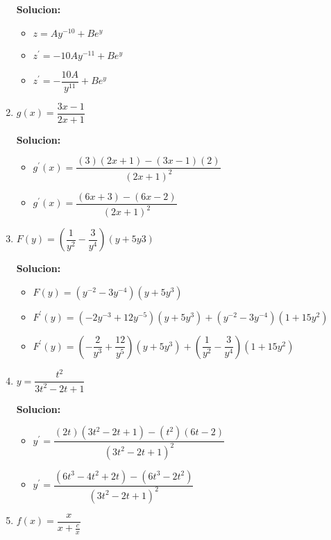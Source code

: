 \documentclass{article}
\begin{document}
\begin{enumerate}[start=5, label=\textbf{\arabic*.}]
    \textbf{Solucion: }
    \begin{itemize}
        \item $z = Ay^{-10} + Be^y$
        \item $z^{\prime} = -10Ay^{-11} + Be^y$
        \item $z^{\prime} = -\dfrac{10A}{y^{11}} + Be^y$
    \end{itemize}
    \vspace{0.5em}
    
    \item $g(x) = \dfrac{3x-1}{2x+1}$
    
    \textbf{Solucion: }
    \begin{itemize}
        \item $g^{\prime}(x) = \dfrac{(3)(2x+1) - (3x-1)(2)}{(2x+1)^2}$
        \item $g^{\prime}(x) = \dfrac{(6x+3) - (6x-2)}{(2x+1)^2}$
    \end{itemize}
    \vspace{0.5em}
        
    \item $F(y) = \left(\dfrac{1}{y^2}-\dfrac{3}{y^4}\right)(y+5y3)$
    
    \textbf{Solucion: }
    \begin{itemize}
        \item $F(y) = (y^{-2}-3y^{-4})(y+5y^3)$
        \item $F^{\prime}(y) = (-2y^{-3}+12y^{-5})(y+5y^3) + (y^{-2}-3y^{-4})(1+15y^2)$
        \item $F^{\prime}(y) = \left(-\dfrac{2}{y^3}+\dfrac{12}{y^5}\right)(y+5y^3)+\left(\dfrac{1}{y^2}-\dfrac{3}{y^4}\right)(1+15y^2)$
    \end{itemize}
    \vspace{0.5em}
        
    \item $y = \dfrac{t^2}{3t^2-2t+1}$
    
    \textbf{Solucion: }
    \begin{itemize}
        \item $y^{\prime} = \dfrac{(2t)(3t^2-2t+1) - (t^2)(6t-2)}{(3t^2-2t+1)^2}$
        \item $y^{\prime} = \dfrac{(6t^3-4t^2+2t) - (6t^3-2t^2)}{(3t^2-2t+1)^2}$
    \end{itemize}
    \vspace{0.5em}
        
    \item $f(x) = \dfrac{x}{x+\frac{c}{x}}$
    

\end{enumerate}
\end{document}
